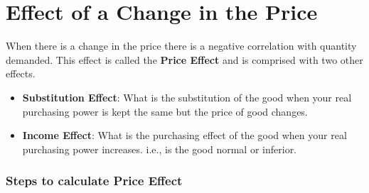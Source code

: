 \documentclass[../ECON-281-Notes.tex]{subfiles}
\begin{document}
\section{Effect of a Change in the Price}
When there is a change in the price there is a negative correlation with quantity demanded. This effect is called the \textbf{Price Effect} and is comprised with two other effects. 
\begin{itemize}
    \item \textbf{Substitution Effect}: What is the substitution of the good when your real purchasing power is kept the same but the price of good changes. 
    \item \textbf{Income Effect}: What is the purchasing effect of the good when your real purchasing power increases. i.e., is the good normal or inferior.
\end{itemize}

\subsubsection{Steps to calculate Price Effect}
\end{document}
